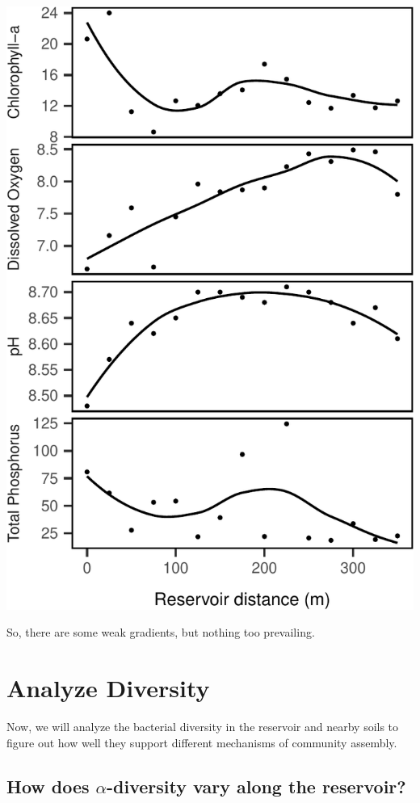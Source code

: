 \documentclass[]{article}
\begin{document}
\begin{center}\includegraphics{ReservoirGradient_files/figure-latex/env_plot-1} \end{center}

So, there are some weak gradients, but nothing too prevailing.

\hypertarget{analyze-diversity}{%
\section{Analyze Diversity}\label{analyze-diversity}}

Now, we will analyze the bacterial diversity in the reservoir and nearby
soils to figure out how well they support different mechanisms of
community assembly.

\hypertarget{how-does-alpha-diversity-vary-along-the-reservoir}{%
\subsection{\texorpdfstring{How does \(\alpha\)-diversity vary along the
reservoir?}{How does \textbackslash{}alpha-diversity vary along the reservoir?}}\label{how-does-alpha-diversity-vary-along-the-reservoir}}
\end{document}
